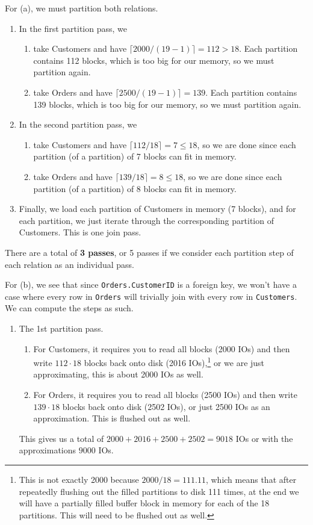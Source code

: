 \documentclass{article}
\begin{document}
\begin{example}
      For (a), we must partition both relations. 
      \begin{enumerate}
        \item In the first partition pass, we 
          \begin{enumerate}
            \item take Customers and have $\lceil 2000 / (19 - 1) \rceil = 112 > 18$. Each partition contains 112 blocks, which is too big for our memory, so we must partition again.
            \item take Orders and have $\lceil 2500 / (19 - 1) \rceil = 139$. Each partition contains 139 blocks, which is too big for our memory, so we must partition again.
          \end{enumerate}
        \item In the second partition pass, we 
          \begin{enumerate}
            \item take Customers and have $\lceil 112 / 18 \rceil = 7 \leq 18$, so we are done since each partition (of a partition) of 7 blocks can fit in memory.  
            \item take Orders and have $\lceil 139 / 18 \rceil = 8 \leq 18$, so we are done since each partition (of a partition) of 8 blocks can fit in memory.  
          \end{enumerate}
        \item Finally, we load each partition of Customers in memory (7 blocks), and for each partition, we just iterate through the corresponding partition of Customers. This is one join pass. 
      \end{enumerate}
      There are a total of \textbf{3 passes}, or 5 passes if we consider each partition step of each relation as an individual pass. 

      For (b), we see that since \texttt{Orders.CustomerID} is a foreign key, we won't have a case where every row in \texttt{Orders} will trivially join with every row in \texttt{Customers}. We can compute the steps as such. 
      \begin{enumerate}
        \item The 1st partition pass. 
          \begin{enumerate}
            \item For Customers, it requires you to read all blocks (2000 IOs) and then write $112 \cdot 18$ blocks back onto disk (2016 IOs),\footnote{This is not exactly 2000 because $2000 / 18 = 111.11$, which means that after repeatedly flushing out the filled partitions to disk 111 times, at the end we will have a partially filled buffer block in memory for each of the 18 partitions. This will need to be flushed out as well.} or we are just approximating, this is about 2000 IOs as well.  
            \item For Orders, it requires you to read all blocks (2500 IOs) and then write $139 \cdot 18$ blocks back onto disk (2502 IOs), or just 2500 IOs as an approximation. This is flushed out as well. 
          \end{enumerate}
          This gives us a total of $2000 + 2016 + 2500 + 2502 = 9018$ IOs or with the approximations $9000$ IOs. 


\end{enumerate}
\end{example}
\end{document}
